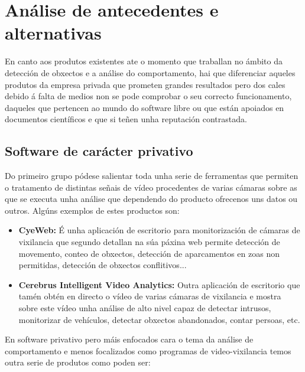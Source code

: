 \chapter{Análise de antecedentes e alternativas}
    En canto aos produtos existentes ate o momento que traballan no ámbito da detección de obxectos
    e a análise do comportamento, hai que diferenciar aqueles produtos da empresa
    privada que prometen grandes resultados pero dos cales debido á falta de medios non se pode 
    comprobar o seu correcto funcionamento, daqueles que pertencen ao mundo do software libre ou que
    están apoiados en documentos científicos e que si teñen unha reputación contrastada.
    
    
    \section{Software de carácter privativo}
    
        Do primeiro grupo pódese salientar toda unha serie de ferramentas que permiten o tratamento de 
        distintas señais de vídeo procedentes de varias cámaras sobre as que se executa unha análise que
        dependendo do producto ofrecenos uns datos ou outros. Algúns exemplos de estes productos son:
        
        \begin{itemize}
        \item \textbf{CyeWeb:}\cite{CyeWeb}
            É unha aplicación de escritorio para monitorización de cámaras de vixilancia que segundo 
            detallan na súa páxina web permite detección de movemento, conteo de obxectos, detección de
            aparcamentos en zoas non permitidas, detección de obxectos conflitivos...
            
        \item \textbf{Cerebrus Intelligent Video Analytics:}\cite{adventura-cerebrus-intelligent-video-analytics}
            Outra aplicación de escritorio que tamén obtén en directo o vídeo de varias cámaras de 
            vixilancia e mostra sobre este vídeo unha análise de alto nivel capaz de detectar intrusos,
            monitorizar de vehículos, detectar obxectos abandonados, contar persoas, etc.
        \end{itemize}
        
        En software privativo pero máis enfocados cara o tema da análise de comportamento e menos
        focalizados como programas de video-vixilancia temos outra serie de produtos como poden ser:
        
